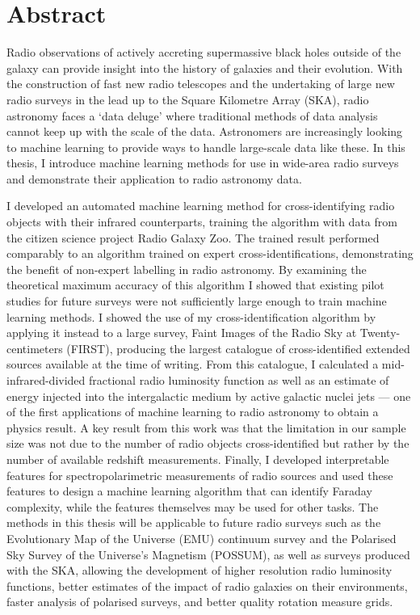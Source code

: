 \chapter*{Abstract}
\vspace{-1em}

Radio observations of actively accreting supermassive black holes outside of the galaxy can provide insight into the history of galaxies and their evolution. With the construction of fast new radio telescopes and the undertaking of large new radio surveys in the lead up to the Square Kilometre Array (SKA), radio astronomy faces a `data deluge' where traditional methods of data analysis cannot keep up with the scale of the data. Astronomers are increasingly looking to machine learning to provide ways to handle large-scale data like these. In this thesis, I introduce machine learning methods for use in wide-area radio surveys and demonstrate their application to radio astronomy data.

I developed an automated machine learning method for cross-identifying radio objects with their infrared counterparts, training the algorithm with data from the citizen science project Radio Galaxy Zoo. The trained result performed comparably to an algorithm trained on expert cross-identifications, demonstrating the benefit of non-expert labelling in radio astronomy. By examining the theoretical maximum accuracy of this algorithm I showed that existing pilot studies for future surveys were not sufficiently large enough to train machine learning methods. I showed the use of my cross-identification algorithm by applying it instead to a large survey, Faint Images of the Radio Sky at Twenty-centimeters (FIRST), producing the largest catalogue of cross-identified extended sources available at the time of writing. From this catalogue, I calculated a mid-infrared-divided fractional radio luminosity function as well as an estimate of energy injected into the intergalactic medium by active galactic nuclei jets --- one of the first applications of machine learning to radio astronomy to obtain a physics result. A key result from this work was that the limitation in our sample size was not due to the number of radio objects cross-identified but rather by the number of available redshift measurements. Finally, I developed interpretable features for spectropolarimetric measurements of radio sources and used these features to design a machine learning algorithm that can identify Faraday complexity, while the features themselves may be used for other tasks. The methods in this thesis will be applicable to future radio surveys such as the Evolutionary Map of the Universe (EMU) continuum survey and the Polarised Sky Survey of the Universe's Magnetism (POSSUM), as well as surveys produced with the SKA, allowing the development of higher resolution radio luminosity functions, better estimates of the impact of radio galaxies on their environments, faster analysis of polarised surveys, and better quality rotation measure grids.

